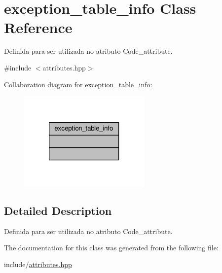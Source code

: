 \hypertarget{classexception__table__info}{\section{exception\+\_\+table\+\_\+info Class Reference}
\label{classexception__table__info}
}


Definida para ser utilizada no atributo Code\+\_\+attribute.  




{\ttfamily \#include $<$attributes.\+hpp$>$}



Collaboration diagram for exception\+\_\+table\+\_\+info\+:\nopagebreak
\begin{figure}[H]
\begin{center}
\leavevmode
\includegraphics[width=184pt]{classexception__table__info__coll__graph}
\end{center}
\end{figure}


\subsection{Detailed Description}
Definida para ser utilizada no atributo Code\+\_\+attribute. 

The documentation for this class was generated from the following file\+:\begin{DoxyCompactItemize}
\item 
include/\hyperlink{attributes_8hpp}{attributes.\+hpp}\end{DoxyCompactItemize}
